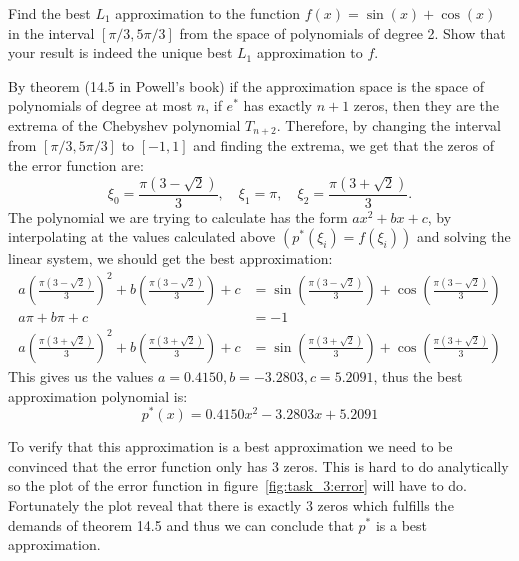 \begin{problem}
Find the best $L_1$ approximation to the function $f(x) = \sin(x) + \cos(x)$ in the interval $[\pi/3, 5\pi/3]$ from the space of polynomials of degree 2. Show that your result is indeed the unique best $L_1$ approximation to $f$.
\end{problem}

\begin{solution}
  By theorem (14.5 in Powell's book) if the approximation space is the
  space of polynomials of degree at most $n$, if $e^*$ has exactly
  $n+1$ zeros, then they are the extrema of the Chebyshev polynomial
  $T_{n+2}$. Therefore, by changing the interval from
  $[\pi/3, 5\pi/3]$ to $[-1,1]$ and finding the extrema, we get that
  the zeros of the error function are:
\begin{equation*}
  \xi_0 = \frac{\pi(3-\sqrt{2})}{3}, \quad \xi_1 = \pi, \quad \xi_2 = \frac{\pi(3+\sqrt{2})}{3}.
\end{equation*}
The polynomial we are trying to calculate has the form $ax^2+bx+c$, by
interpolating at the values calculated above $(p^*(\xi_i) = f(\xi_i))$
and solving the linear system, we should get the best approximation:
\begin{align*}
a\left(\frac{\pi(3-\sqrt{2})}{3}\right)^2+b\left(\frac{\pi(3-\sqrt{2})}{3}\right)+c &= \sin\left(\frac{\pi(3-\sqrt{2})}{3}\right) + \cos\left(\frac{\pi(3-\sqrt{2})}{3}\right) \\
a \pi + b\pi +c &=-1 \\
a\left(\frac{\pi(3+\sqrt{2})}{3}\right)^2 +b\left(\frac{\pi(3+\sqrt{2})}{3}\right) + c &= \sin\left(\frac{\pi(3+\sqrt{2})}{3}\right) + \cos\left(\frac{\pi(3+\sqrt{2})}{3}\right)
\end{align*}
This gives us the values $a=0.4150, b = -3.2803, c = 5.2091$, thus the
best approximation polynomial is:
\begin{equation*}
p^*(x)=0.4150x^2 -3.2803x+5.2091
\end{equation*}

To verify that this approximation is a best approximation we need to
be convinced that the error function only has 3 zeros. This is hard to
do analytically so the plot of the error function in figure~\ref{fig:task_3:error} will have to do. Fortunately the plot reveal
that there is exactly 3 zeros which fulfills the demands of theorem
14.5 and thus we can conclude that $p^*$ is a best approximation. 


\end{solution}
